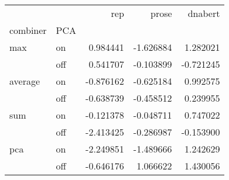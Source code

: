 \begin{tabular}{llrrr}
\toprule
    &     &       rep &     prose &   dnabert \\
combiner & PCA &           &           &           \\
\midrule
max & on &  0.984441 & -1.626884 &  1.282021 \\
    & off &  0.541707 & -0.103899 & -0.721245 \\
average & on & -0.876162 & -0.625184 &  0.992575 \\
    & off & -0.638739 & -0.458512 &  0.239955 \\
sum & on & -0.121378 & -0.048711 &  0.747022 \\
    & off & -2.413425 & -0.286987 & -0.153900 \\
pca & on & -2.249851 & -1.489666 &  1.242629 \\
    & off & -0.646176 &  1.066622 &  1.430056 \\
\bottomrule
\end{tabular}
